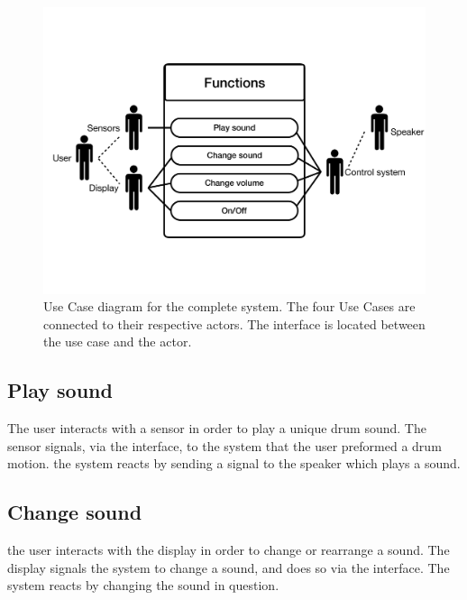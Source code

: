\begin{figure}[htbp]
\centering
\includegraphics[scale=0.4]{Figure/protoUseCase01.pdf}
\caption{
Use Case diagram for the complete system. The four Use Cases are connected to their respective actors. The interface is located between the use case and the actor.}
\label{fig:protoUseCase}
\end{figure}

\subsection{Play sound}
The user interacts with a sensor in order to play a unique drum sound. The sensor signals, via the interface, to the system that the user preformed a drum motion. the system reacts by sending a signal to the speaker which plays a sound.

\subsection{Change sound}
the user interacts with the display in order to change or rearrange a sound. The display signals the system to change a sound, and does so via the interface. The system reacts by changing the sound in question.

